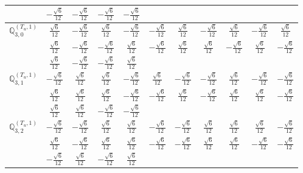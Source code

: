\documentclass[fleqn,10pt,landscape]{article}
\begin{document}
\begin{itemize}
{\begin{center}
\begin{longtable}{ccccccccccc}
& $ - \frac{\sqrt{6}}{12} $ & $ - \frac{\sqrt{6}}{12} $ & $ - \frac{\sqrt{6}}{12} $ & $ - \frac{\sqrt{6}}{12} $ & $  $ & $  $ & $  $ & $  $ & $  $ & $  $ \\ \hline
$\mathbb{Q}_{3,0}^{(T_{u},1)}$ & $ \frac{\sqrt{6}}{12} $ & $ - \frac{\sqrt{6}}{12} $ & $ \frac{\sqrt{6}}{12} $ & $ - \frac{\sqrt{6}}{12} $ & $ - \frac{\sqrt{6}}{12} $ & $ \frac{\sqrt{6}}{12} $ & $ - \frac{\sqrt{6}}{12} $ & $ \frac{\sqrt{6}}{12} $ & $ - \frac{\sqrt{6}}{12} $ & $ \frac{\sqrt{6}}{12} $ \\
& $ \frac{\sqrt{6}}{12} $ & $ - \frac{\sqrt{6}}{12} $ & $ - \frac{\sqrt{6}}{12} $ & $ \frac{\sqrt{6}}{12} $ & $ - \frac{\sqrt{6}}{12} $ & $ \frac{\sqrt{6}}{12} $ & $ \frac{\sqrt{6}}{12} $ & $ - \frac{\sqrt{6}}{12} $ & $ \frac{\sqrt{6}}{12} $ & $ - \frac{\sqrt{6}}{12} $ \\
& $ \frac{\sqrt{6}}{12} $ & $ - \frac{\sqrt{6}}{12} $ & $ - \frac{\sqrt{6}}{12} $ & $ \frac{\sqrt{6}}{12} $ & $  $ & $  $ & $  $ & $  $ & $  $ & $  $ \\ \hline
$\mathbb{Q}_{3,1}^{(T_{u},1)}$ & $ - \frac{\sqrt{6}}{12} $ & $ \frac{\sqrt{6}}{12} $ & $ \frac{\sqrt{6}}{12} $ & $ - \frac{\sqrt{6}}{12} $ & $ \frac{\sqrt{6}}{12} $ & $ - \frac{\sqrt{6}}{12} $ & $ - \frac{\sqrt{6}}{12} $ & $ \frac{\sqrt{6}}{12} $ & $ - \frac{\sqrt{6}}{12} $ & $ - \frac{\sqrt{6}}{12} $ \\
& $ \frac{\sqrt{6}}{12} $ & $ \frac{\sqrt{6}}{12} $ & $ \frac{\sqrt{6}}{12} $ & $ - \frac{\sqrt{6}}{12} $ & $ - \frac{\sqrt{6}}{12} $ & $ \frac{\sqrt{6}}{12} $ & $ - \frac{\sqrt{6}}{12} $ & $ \frac{\sqrt{6}}{12} $ & $ \frac{\sqrt{6}}{12} $ & $ - \frac{\sqrt{6}}{12} $ \\
& $ \frac{\sqrt{6}}{12} $ & $ \frac{\sqrt{6}}{12} $ & $ - \frac{\sqrt{6}}{12} $ & $ - \frac{\sqrt{6}}{12} $ & $  $ & $  $ & $  $ & $  $ & $  $ & $  $ \\ \hline
$\mathbb{Q}_{3,2}^{(T_{u},1)}$ & $ - \frac{\sqrt{6}}{12} $ & $ - \frac{\sqrt{6}}{12} $ & $ \frac{\sqrt{6}}{12} $ & $ \frac{\sqrt{6}}{12} $ & $ - \frac{\sqrt{6}}{12} $ & $ - \frac{\sqrt{6}}{12} $ & $ \frac{\sqrt{6}}{12} $ & $ \frac{\sqrt{6}}{12} $ & $ \frac{\sqrt{6}}{12} $ & $ - \frac{\sqrt{6}}{12} $ \\
& $ \frac{\sqrt{6}}{12} $ & $ - \frac{\sqrt{6}}{12} $ & $ \frac{\sqrt{6}}{12} $ & $ \frac{\sqrt{6}}{12} $ & $ - \frac{\sqrt{6}}{12} $ & $ - \frac{\sqrt{6}}{12} $ & $ \frac{\sqrt{6}}{12} $ & $ \frac{\sqrt{6}}{12} $ & $ - \frac{\sqrt{6}}{12} $ & $ - \frac{\sqrt{6}}{12} $ \\
& $ - \frac{\sqrt{6}}{12} $ & $ \frac{\sqrt{6}}{12} $ & $ - \frac{\sqrt{6}}{12} $ & $ \frac{\sqrt{6}}{12} $ & $  $ & $  $ & $  $ & $  $ & $  $ & $  $ \\ \hline

\end{longtable}
\end{center}}
\end{itemize}
\end{document}
